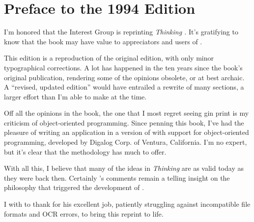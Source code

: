 \chapter*{Preface to the 1994 Edition}

I'm honored that the \Forth{} Interest Group is reprinting \emph{Thinking
\Forth{}.} It's gratifying to know that the book may have value to
appreciators and users of \Forth{}.

This edition is a reproduction of the original edition, with only
minor typographical corrections. A lot has happened in the ten years
since the book's original publication, rendering some of the opinions
obsolete, or at best archaic. A ``revised, updated edition'' would
have entrailed a rewrite of many sections, a larger effort than I'm
able to make at the time.

Off all the opinions in the book, the one that I most regret seeing gin
print is my criticism of object-oriented programming. Since penning
this book, I've had the pleasure of writing an application in a
version of \Forth{} with support for object-oriented programming,
developed by Digalog Corp. of Ventura, California. I'm no expert, but
it's clear that the methodology has much to offer.

With all this, I believe that many of the ideas in \emph{Thinking
\Forth{}} are as valid today as they were back then. Certainly 's comments remain a telling insight on the philosophy that
triggered the development of \Forth{}.

I with to thank  for his excellent job, patiently
struggling against incompatible file formats and OCR errors, to bring
this reprint to life.
